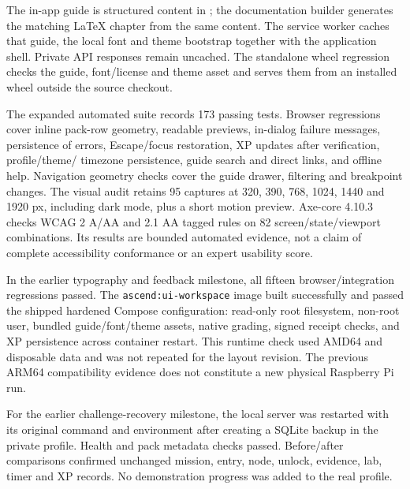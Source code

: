 The in-app guide is structured content in ; the documentation
builder generates the matching LaTeX chapter from the same content. The service
worker caches that guide, the local font and theme bootstrap together with the
application shell. Private API responses remain uncached. The standalone wheel
regression checks the guide, font/license and theme asset and serves them from an
installed wheel outside the source checkout.

The expanded automated suite records 173 passing tests. Browser regressions cover
inline pack-row geometry, readable previews, in-dialog failure messages, persistence
of errors, Escape/focus restoration, XP updates after verification, profile/theme/
timezone persistence, guide search and direct links, and offline help. Navigation
geometry checks cover the guide drawer, filtering and breakpoint changes. The visual
audit retains 95 captures at 320, 390, 768, 1024, 1440 and 1920 px, including dark mode,
plus a short motion preview. Axe-core 4.10.3 checks WCAG 2 A/AA and 2.1 AA tagged rules on 82 screen/state/viewport
combinations. Its results are bounded automated evidence, not a claim of complete
accessibility conformance or an expert usability score.

In the earlier typography and feedback milestone, all fifteen
browser/integration regressions passed. The \texttt{ascend:ui-workspace}
image built successfully and passed the shipped hardened Compose configuration:
read-only root filesystem, non-root user, bundled guide/font/theme assets, native
grading, signed receipt checks, and XP persistence across container restart. This
runtime check used AMD64 and disposable data and was not repeated for the layout
revision. The previous ARM64 compatibility
evidence does not constitute a new physical Raspberry Pi run.

For the earlier challenge-recovery milestone, the local server was restarted with its original command and environment
after creating a SQLite backup in the private profile. Health and pack metadata
checks passed. Before/after comparisons confirmed unchanged mission, entry, node,
unlock, evidence, lab, timer and XP records. No demonstration progress was added
to the real profile.


